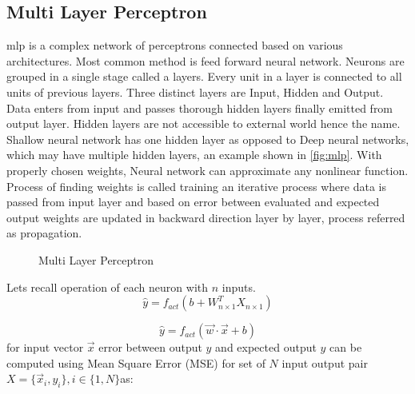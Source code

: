\subsection{Multi Layer Perceptron}
\acrlong{mlp} is a complex network of perceptrons connected based on various architectures. Most common method is feed forward neural network. Neurons are grouped in a single stage called a layers. Every unit in a layer is connected to all units of previous layers. Three distinct layers are Input, Hidden and Output. Data enters from input and passes thorough hidden layers finally emitted from output layer. Hidden layers are not accessible to external world hence the name. Shallow neural network has one hidden layer as opposed to Deep neural networks, which may have multiple hidden layers, an example shown in \autoref{fig:mlp}. With properly chosen weights, Neural network can approximate any nonlinear function. Process of finding weights is called training an iterative process where data is passed from input layer and based on error between evaluated and expected output weights are updated in backward direction layer by layer, process referred as propagation.
\begin{figure}
    \centering
    \scalebox{0.65}{}
    \caption{Multi Layer Perceptron}
    \label{fig:mlp}
\end{figure}
Lets recall operation of each neuron with $n$ inputs. 
\begin{equation}
    \hat{y}=f_{act}(b+W_{n\times1}^TX_{n\times1})
\end{equation}

\begin{equation*}
\hat{y} =f_{act}(\vec{w} \cdotp \vec{x} +b)
\end{equation*}
for input vector $\displaystyle \vec{x}$ error between output $\displaystyle \hat{y}$ and expected output $\displaystyle y$ can be computed using Mean Square Error (MSE) for set of $\displaystyle N$ input output pair $\displaystyle X=\{\vec{x}_{i} ,y_{i}\} ,i\in \{1,N\}$as:

